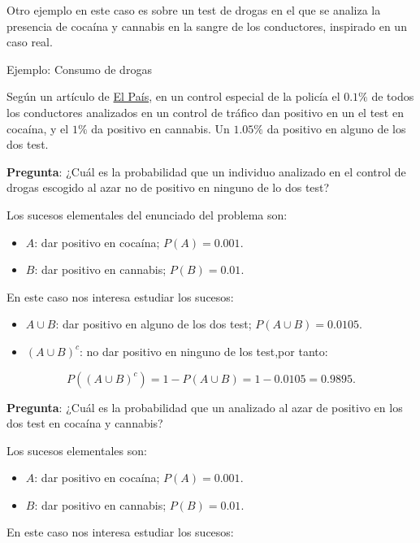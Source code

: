 \documentclass[
  letterpaper,
  DIV=11,
  numbers=noendperiod]{scrreprt}
\providecommand{\tightlist}{%
  \setlength{\itemsep}{0pt}\setlength{\parskip}{0pt}}\usepackage{longtable,booktabs,array}
\begin{document}
Otro ejemplo en este caso es sobre un test de drogas en el que se
analiza la presencia de cocaína y cannabis en la sangre de los
conductores, inspirado en un caso real.

\begin{Ejemplo}{Ejemplo: Consumo de drogas}{}

Según un artículo de
\href{https://elpais.com/politica/2019/01/02/actualidad/1546426491_623324.html}{El
País}, en un control especial de la policía el \(0.1\%\) de todos los
conductores analizados en un control de tráfico dan positivo en un el
test en cocaína, y el \(1\%\) da positivo en cannabis. Un \(1.05\%\) da
positivo en alguno de los dos test.

\textbf{Pregunta}: ¿Cuál es la probabilidad que un individuo analizado
en el control de drogas escogido al azar no de positivo en ninguno de lo
dos test?

Los sucesos elementales del enunciado del problema son:

\begin{itemize}
\tightlist
\item
  \(A\): dar positivo en cocaína; \(P(A)=0.001.\)
\item
  \(B\): dar positivo en cannabis; \(P(B)=0.01.\)
\end{itemize}

En este caso nos interesa estudiar los sucesos:

\begin{itemize}
\tightlist
\item
  \(A\cup B\): dar positivo en alguno de los dos test;
  \(P(A\cup B)=0.0105.\)
\item
  \((A\cup B)^c\): no dar positivo en ninguno de los test,por tanto:
\end{itemize}

\[P((A\cup B)^c)=1-P(A\cup B)=1-0.0105=0.9895.\]

\textbf{Pregunta}: ¿Cuál es la probabilidad que un analizado al azar de
positivo en los dos test en cocaína y cannabis?

Los sucesos elementales son:

\begin{itemize}
\tightlist
\item
  \(A\): dar positivo en cocaína; \(P(A)=0.001.\)
\item
  \(B\): dar positivo en cannabis; \(P(B)=0.01.\)
\end{itemize}

En este caso nos interesa estudiar los sucesos:


\end{Ejemplo}
\end{document}
